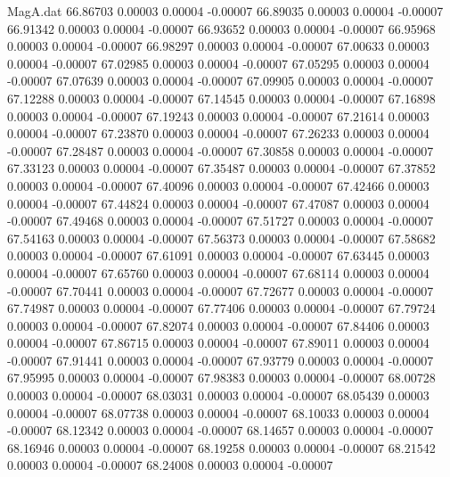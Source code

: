 \begin{filecontents}{MagA.dat}
  66.86703    0.00003    0.00004   -0.00007
  66.89035    0.00003    0.00004   -0.00007
  66.91342    0.00003    0.00004   -0.00007
  66.93652    0.00003    0.00004   -0.00007
  66.95968    0.00003    0.00004   -0.00007
  66.98297    0.00003    0.00004   -0.00007
  67.00633    0.00003    0.00004   -0.00007
  67.02985    0.00003    0.00004   -0.00007
  67.05295    0.00003    0.00004   -0.00007
  67.07639    0.00003    0.00004   -0.00007
  67.09905    0.00003    0.00004   -0.00007
  67.12288    0.00003    0.00004   -0.00007
  67.14545    0.00003    0.00004   -0.00007
  67.16898    0.00003    0.00004   -0.00007
  67.19243    0.00003    0.00004   -0.00007
  67.21614    0.00003    0.00004   -0.00007
  67.23870    0.00003    0.00004   -0.00007
  67.26233    0.00003    0.00004   -0.00007
  67.28487    0.00003    0.00004   -0.00007
  67.30858    0.00003    0.00004   -0.00007
  67.33123    0.00003    0.00004   -0.00007
  67.35487    0.00003    0.00004   -0.00007
  67.37852    0.00003    0.00004   -0.00007
  67.40096    0.00003    0.00004   -0.00007
  67.42466    0.00003    0.00004   -0.00007
  67.44824    0.00003    0.00004   -0.00007
  67.47087    0.00003    0.00004   -0.00007
  67.49468    0.00003    0.00004   -0.00007
  67.51727    0.00003    0.00004   -0.00007
  67.54163    0.00003    0.00004   -0.00007
  67.56373    0.00003    0.00004   -0.00007
  67.58682    0.00003    0.00004   -0.00007
  67.61091    0.00003    0.00004   -0.00007
  67.63445    0.00003    0.00004   -0.00007
  67.65760    0.00003    0.00004   -0.00007
  67.68114    0.00003    0.00004   -0.00007
  67.70441    0.00003    0.00004   -0.00007
  67.72677    0.00003    0.00004   -0.00007
  67.74987    0.00003    0.00004   -0.00007
  67.77406    0.00003    0.00004   -0.00007
  67.79724    0.00003    0.00004   -0.00007
  67.82074    0.00003    0.00004   -0.00007
  67.84406    0.00003    0.00004   -0.00007
  67.86715    0.00003    0.00004   -0.00007
  67.89011    0.00003    0.00004   -0.00007
  67.91441    0.00003    0.00004   -0.00007
  67.93779    0.00003    0.00004   -0.00007
  67.95995    0.00003    0.00004   -0.00007
  67.98383    0.00003    0.00004   -0.00007
  68.00728    0.00003    0.00004   -0.00007
  68.03031    0.00003    0.00004   -0.00007
  68.05439    0.00003    0.00004   -0.00007
  68.07738    0.00003    0.00004   -0.00007
  68.10033    0.00003    0.00004   -0.00007
  68.12342    0.00003    0.00004   -0.00007
  68.14657    0.00003    0.00004   -0.00007
  68.16946    0.00003    0.00004   -0.00007
  68.19258    0.00003    0.00004   -0.00007
  68.21542    0.00003    0.00004   -0.00007
  68.24008    0.00003    0.00004   -0.00007

\end{filecontents}
